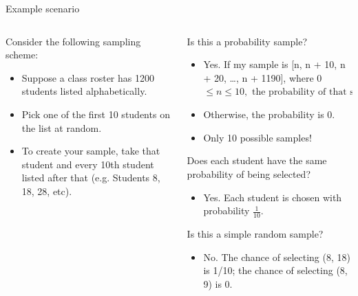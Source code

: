 \documentclass[aspectratio=169]{../latex_main/tntbeamer}  %
\begin{document}
	\begin{frame}{Example scenario}
	    \begin{columns}
	        \begin{column}{.3\textwidth}
	            Consider the following sampling scheme:

	            \begin{itemize}
	                \item Suppose a class roster has 1200 students listed alphabetically.
	                \item Pick one of the first 10 students on the list at random.
	                \item To create your sample, take that student and every 10th student listed after that (e.g. Students 8, 18, 28, etc).
	            \end{itemize}
                 
	        \end{column}
	        
	        \begin{column}{.6\textwidth}
	           Is this a probability sample?
	           \begin{itemize}
	               \item Yes. If my sample is [n, n + 10, n + 20, …, n + 1190], where 0 $\leq n \leq 10, \text{ the probability of that sample is }\frac{1}{10}$
	               \item Otherwise, the probability is 0.
	               \item Only 10 possible samples!
	           \end{itemize}
	           Does each student have the same probability of being selected?
	           \begin{itemize}
	               \item Yes. Each student is chosen with probability $\frac{1}{10}$. 
	           \end{itemize}
	           Is this a simple random sample?
                \begin{itemize}
                    \item No. The chance of selecting (8, 18) is 1/10; the chance of selecting (8, 9) is 0.
                \end{itemize}

	        \end{column}
	        
	    \end{columns}
	    
	\end{frame}
	
\end{document}
